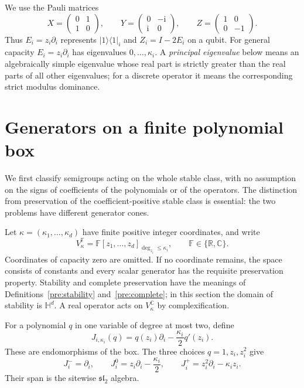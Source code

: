 \documentclass[reqno]{amsart}
\theoremstyle{definition}
\theoremstyle{remark}
\newcommand{\C}{\mathbb C}
\newcommand{\R}{\mathbb R}
\newcommand{\HH}{\mathbb H}
\begin{document}
We use the Pauli matrices
\[
 X=\begin{pmatrix}0&1\\1&0\end{pmatrix},\qquad
 Y=\begin{pmatrix}0&-\mathrm i\\\mathrm i&0\end{pmatrix},\qquad
 Z=\begin{pmatrix}1&0\\0&-1\end{pmatrix}.
\]
Thus $E_i=z_i\partial_i$ represents $|1\rangle\langle1|_i$
and $Z_i=I-2E_i$ on a qubit.
For general capacity $E_i=z_i\partial_i$ has eigenvalues
$0,\ldots,\kappa_i$. A \emph{principal eigenvalue} below means an
algebraically simple eigenvalue whose real part is strictly greater
than the real parts of all other eigenvalues; for a discrete operator
it means the corresponding strict modulus dominance.


\section{Generators on a finite polynomial box}
\label{gen:section}

We first classify semigroups acting on the whole stable class, with no
assumption on the signs of coefficients of the polynomials or of the
operators.  The distinction from preservation of the coefficient-positive
stable class is essential: the two problems have different generator cones.

Let \(\kappa=(\kappa_1,\ldots,\kappa_d)\) have finite positive integer
coordinates, and write
\[
 V_\kappa^{\mathbb F}
 =\mathbb F[z_1,\ldots,z_d]_{\deg_{z_i}\leq\kappa_i},
 \qquad \mathbb F\in\{\R,\C\}.
\]
Coordinates of capacity zero are omitted.  If no coordinate remains, the
space consists of constants and every scalar generator has the requisite
preservation property.  Stability and complete preservation have the meanings
of Definitions~\ref{pre:stability} and~\ref{pre:complete}; in this section the
domain of stability is \(\HH^d\).
A real operator acts on \(V_\kappa^\C\) by complexification.

For a polynomial \(q\) in one variable of degree at most two, define
\begin{equation}
 J_{i,\kappa_i}(q)
 =q(z_i)\partial_i-\frac{\kappa_i}{2}q'(z_i).
 \label{gen:eq-J}
\end{equation}
These are endomorphisms of the box.  The three choices \(q=1,z_i,z_i^2\)
give
\[
 J_i^-=\partial_i,\qquad
 J_i^0=z_i\partial_i-\frac{\kappa_i}{2},\qquad
 J_i^+=z_i^2\partial_i-\kappa_i z_i.
\]
Their span is the sitewise \(\mathfrak{sl}_2\) algebra.
\end{document}
